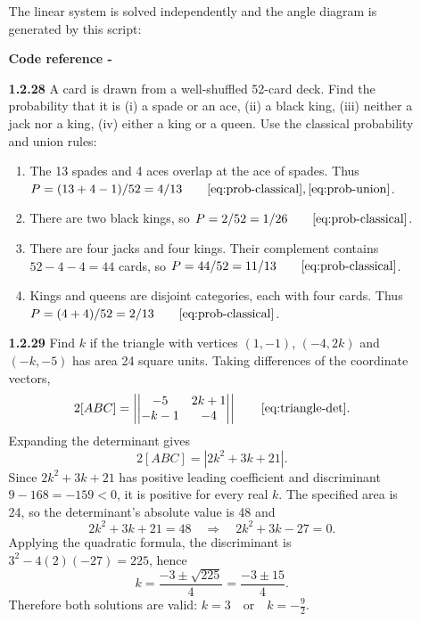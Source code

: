 \begin{enumerate}[label={},leftmargin=0pt]
\begin{enumerate}[label={},leftmargin=4mm,itemsep=9pt]
The linear system is solved independently and the angle diagram is generated by this script:
\par\smallskip
\noindent\textbf{Code reference -}
\par\noindent{}
\par\smallskip
\setcounter{enumii}{28}
\setcounter{equation}{0}
\item[\textbf{1.2.28}] A card is drawn from a well-shuffled 52-card deck. Find the probability that it is (i) a spade or an ace, (ii) a black king, (iii) neither a jack nor a king, (iv) either a king or a queen.
\solution Use the classical probability and union rules:
\begin{enumerate}[label=(\roman*)]
\item The 13 spades and 4 aces overlap at the ace of spades. Thus $P=(13+4-1)/52=4/13\qquad\eqref{eq:prob-classical}, \eqref{eq:prob-union}$.
\item There are two black kings, so $P=2/52=1/26\qquad\eqref{eq:prob-classical}$.
\item There are four jacks and four kings. Their complement contains $52-4-4=44$ cards, so $P=44/52=11/13\qquad\eqref{eq:prob-classical}$.
\item Kings and queens are disjoint categories, each with four cards. Thus $P=(4+4)/52=2/13\qquad\eqref{eq:prob-classical}$.
\end{enumerate}

\setcounter{enumii}{29}
\setcounter{equation}{0}
\item[\textbf{1.2.29}] Find $k$ if the triangle with vertices $(1,-1)$, $(-4,2k)$ and $(-k,-5)$ has area 24 square units.
\solution Taking differences of the coordinate vectors,
\begin{equation*}
2[ABC]=\left|\begin{vmatrix}-5&2k+1\\-k-1&-4\end{vmatrix}\right|\qquad\eqref{eq:triangle-det}.
\end{equation*}
Expanding the determinant gives
\begin{equation*}
2[ABC]=|2k^2+3k+21|.
\end{equation*}
Since $2k^2+3k+21$ has positive leading coefficient and discriminant $9-168=-159<0$, it is positive for every real $k$. The specified area is 24, so the determinant's absolute value is 48 and
\begin{equation*}
2k^2+3k+21=48\quad\Longrightarrow\quad2k^2+3k-27=0.
\end{equation*}
Applying the quadratic formula, the discriminant is $3^2-4(2)(-27)=225$, hence
\begin{equation*}
k=\frac{-3\pm\sqrt{225}}4=\frac{-3\pm15}4.
\end{equation*}
Therefore both solutions are valid: $k=3\quad\text{or}\quad k=-\frac92$.




\end{enumerate}
\end{enumerate}
